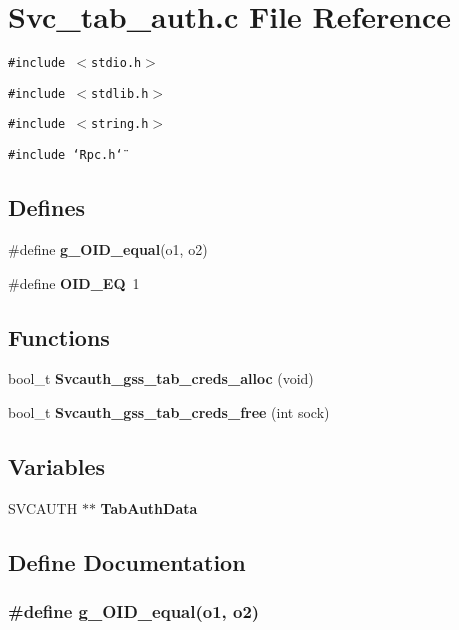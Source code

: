 \section{Svc\_\-tab\_\-auth.c File Reference}
\label{Svc__tab__auth_8c}
{\tt \#include $<$stdio.h$>$}\par
{\tt \#include $<$stdlib.h$>$}\par
{\tt \#include $<$string.h$>$}\par
{\tt \#include \char`\"{}Rpc.h\char`\"{}}\par
\subsection*{Defines}
\begin{CompactItemize}
\item 
\#define {\bf g\_\-OID\_\-equal}(o1, o2)
\item 
\#define {\bf OID\_\-EQ}\ 1
\end{CompactItemize}
\subsection*{Functions}
\begin{CompactItemize}
\item 
bool\_\-t {\bf Svcauth\_\-gss\_\-tab\_\-creds\_\-alloc} (void)
\item 
bool\_\-t {\bf Svcauth\_\-gss\_\-tab\_\-creds\_\-free} (int sock)
\end{CompactItemize}
\subsection*{Variables}
\begin{CompactItemize}
\item 
SVCAUTH $\ast$$\ast$ {\bf Tab\-Auth\-Data}
\end{CompactItemize}


\subsection{Define Documentation}
\subsubsection{\setlength{\rightskip}{0pt plus 5cm}\#define g\_\-OID\_\-equal(o1, o2)}\label{Svc__tab__auth_8c_a0}


